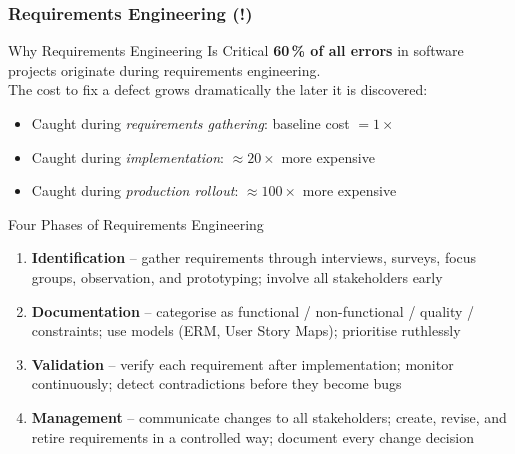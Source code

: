 \begin{frame}
  \frametitle{Requirements Engineering (!)}

  \begin{alertblock}{Why Requirements Engineering Is Critical}
    \textbf{60\,\% of all errors} in software projects originate during requirements engineering.\\[0.3em]
    The cost to fix a defect grows dramatically the later it is discovered:
    \begin{itemize}
      \item Caught during \textit{requirements gathering}: baseline cost $= 1\times$
      \item Caught during \textit{implementation}: $\approx 20\times$ more expensive
      \item Caught during \textit{production rollout}: $\approx 100\times$ more expensive
    \end{itemize}
  \end{alertblock}

  \begin{block}{Four Phases of Requirements Engineering}
    \begin{enumerate}
      \item \textbf{Identification} -- gather requirements through interviews, surveys, focus groups, observation, and prototyping; involve all stakeholders early
      \item \textbf{Documentation} -- categorise as functional / non-functional / quality / constraints; use models (ERM, User Story Maps); prioritise ruthlessly
      \item \textbf{Validation} -- verify each requirement after implementation; monitor continuously; detect contradictions before they become bugs
      \item \textbf{Management} -- communicate changes to all stakeholders; create, revise, and retire requirements in a controlled way; document every change decision
    \end{enumerate}
  \end{block}
\end{frame}

